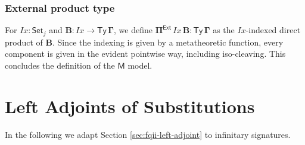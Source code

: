 \documentclass[12pt,a4paper,twoside,openany]{book}
\theoremstyle{remark}
\theoremstyle{definition}
\theoremstyle{theorem}
\newcommand{\mi}[1]{\mathit{#1}}
\newcommand{\bs}[1]{\boldsymbol{#1}}
\newcommand{\Ty}{\mathsf{Ty}}
\newcommand{\ra}{\rightarrow}
\newcommand{\Set}{\mathsf{Set}}
\newcommand{\Pie}{\Pi^{\mathsf{Ext}}}
\newcommand{\bTy}{\bs{\Ty}}
\newcommand{\bGamma}{\bs{\Gamma}}
\newcommand{\bB}{\bs{B}}
\newcommand{\bPie}{\bs{\Pie}}
\newcommand{\bM}{\bs{\mathsf{M}}}
\begin{document}
\subsubsection{External product type}

For $\mi{Ix} : \Set_j$ and $\bB : \mi{Ix} \ra \bTy\,\bGamma$, we define
$\bPie\,\mi{Ix}\,\bB \bs{:} \bTy\,\bGamma$ as the $\mi{Ix}$-indexed direct
product of $\bB$. Since the indexing is given by a metatheoretic function, every
component is given in the evident pointwise way, including iso-cleaving. This
concludes the definition of the $\bM$ model.

\section{Left Adjoints of Substitutions}
\label{sec:iqii-left-adjoints}

In the following we adapt Section \ref{sec:fqii-left-adjoint} to infinitary
signatures.
\end{document}
